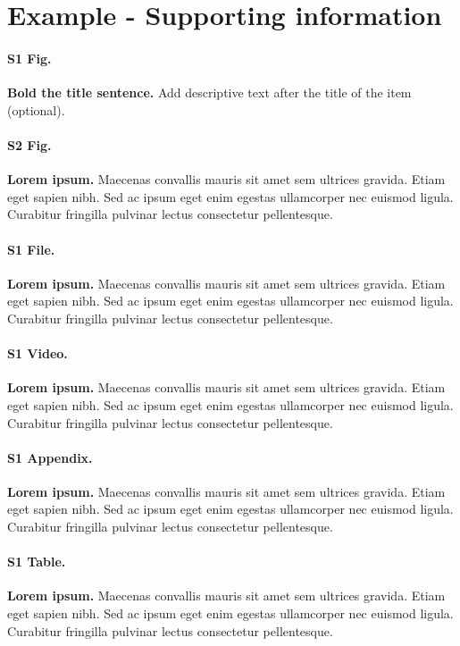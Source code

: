 \documentclass[10pt,letterpaper]{article}
\begin{document}
\section*{Example - Supporting information}

\paragraph*{S1 Fig.}
\label{S1_Fig}
{\bf Bold the title sentence.} Add descriptive text after the title of the item (optional).

\paragraph*{S2 Fig.}
\label{S2_Fig}
{\bf Lorem ipsum.} Maecenas convallis mauris sit amet sem ultrices gravida. Etiam eget sapien nibh. Sed ac ipsum eget enim egestas ullamcorper nec euismod ligula. Curabitur fringilla pulvinar lectus consectetur pellentesque.

\paragraph*{S1 File.}
\label{S1_File}
{\bf Lorem ipsum.}  Maecenas convallis mauris sit amet sem ultrices gravida. Etiam eget sapien nibh. Sed ac ipsum eget enim egestas ullamcorper nec euismod ligula. Curabitur fringilla pulvinar lectus consectetur pellentesque.

\paragraph*{S1 Video.}
\label{S1_Video}
{\bf Lorem ipsum.}  Maecenas convallis mauris sit amet sem ultrices gravida. Etiam eget sapien nibh. Sed ac ipsum eget enim egestas ullamcorper nec euismod ligula. Curabitur fringilla pulvinar lectus consectetur pellentesque.

\paragraph*{S1 Appendix.}
\label{S1_Appendix}
{\bf Lorem ipsum.} Maecenas convallis mauris sit amet sem ultrices gravida. Etiam eget sapien nibh. Sed ac ipsum eget enim egestas ullamcorper nec euismod ligula. Curabitur fringilla pulvinar lectus consectetur pellentesque.

\paragraph*{S1 Table.}
\label{S1_Table}
{\bf Lorem ipsum.} Maecenas convallis mauris sit amet sem ultrices gravida. Etiam eget sapien nibh. Sed ac ipsum eget enim egestas ullamcorper nec euismod ligula. Curabitur fringilla pulvinar lectus consectetur pellentesque.
\end{document}
